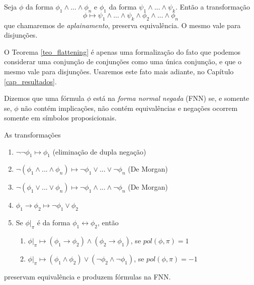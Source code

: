 \begin{theorem}
	\label{teo_flattening}
	Seja $\phi$ da forma $\phi_1 \wedge ... \wedge \phi_n$ e $\phi_1$ da forma $\psi_1 \wedge ... \wedge \psi_k$. Então a transformação $$\phi \longmapsto \psi_1 \wedge ... \wedge \psi_k \wedge \phi_2 \wedge ... \wedge \phi_n$$ que chamaremos de \emph{aplainamento}, preserva equivalência. O mesmo vale para disjunções.
\end{theorem}

O Teorema \ref{teo_flattening} é apenas uma formalização do fato que podemos considerar uma conjunção de conjunções como uma única conjunção, e que o mesmo vale para disjunções. Usaremos este fato mais adiante, no Capítulo \ref{cap_resultados}.

\begin{definition}
    Dizemos que uma fórmula $\phi$ está na \emph{forma normal negada} (FNN) se, e somente se, $\phi$ não contém implicações, não contém equivalências e negações ocorrem somente em símbolos proposicionais.
\end{definition}

\begin{theorem}
    \label{fnn_theorem}
    As transformações
    \begin{enumerate}
        \item $\neg \neg \phi_1 \longmapsto \phi_1$ (eliminação de dupla negação)
        \item $\neg(\phi_1 \wedge ... \wedge \phi_n) \longmapsto \neg \phi_1 \vee ... \vee \neg \phi_n$ (De Morgan)
        \item $\neg(\phi_1 \vee ... \vee \phi_n) \longmapsto \neg \phi_1 \wedge ... \wedge \neg \phi_n$ (De Morgan)
        \item $\phi_1 \rightarrow \phi_2 \longmapsto \neg \phi_1 \vee \phi_2$
        \item Se $\phi|_\pi$ é da forma $\phi_1 \leftrightarrow \phi_2$, então
        \begin{enumerate}
        	\item $\phi|_\pi \longmapsto (\phi_1 \rightarrow \phi_2) \wedge (\phi_2 \rightarrow \phi_1)$, se $pol(\phi,\pi) = 1$
        	\item $\phi|_\pi \longmapsto (\phi_1 \wedge \phi_2) \vee (\neg \phi_2 \wedge \neg \phi_1)$, se $pol(\phi,\pi) = -1$
        \end{enumerate}
    \end{enumerate}
    preservam equivalência e produzem fórmulas na FNN.
\end{theorem}

